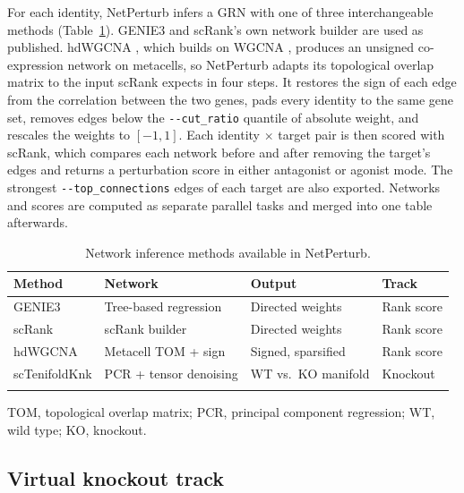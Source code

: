 \documentclass[unnumsec,webpdf,contemporary,large]{oup-authoring-template}
\newcommand{\param}[1]{\texttt{-{}-#1}}
\begin{document}
For each identity, NetPerturb infers a GRN with one of three interchangeable methods (Table~\ref{tab:methods}). GENIE3 \citep{HuynhThu2010genie3} and scRank's own network builder \citep{Li2024scrank} are used as published. hdWGCNA \citep{Morabito2023hdwgcna}, which builds on WGCNA \citep{Langfelder2008wgcna}, produces an unsigned co-expression network on metacells, so NetPerturb adapts its topological overlap matrix to the input scRank expects in four steps. It restores the sign of each edge from the correlation between the two genes, pads every identity to the same gene set, removes edges below the \param{cut\_ratio} quantile of absolute weight, and rescales the weights to $[-1,1]$. Each identity $\times$ target pair is then scored with scRank, which compares each network before and after removing the target's edges and returns a perturbation score in either antagonist or agonist mode. The strongest \param{top\_connections} edges of each target are also exported. Networks and scores are computed as separate parallel tasks and merged into one table afterwards.

\begin{table}[!t]
\begin{center}
\begin{minipage}{\columnwidth}
\caption{Network inference methods available in NetPerturb.\label{tab:methods}}%
\small\begin{tabular}{@{}llll@{}}
\toprule
Method & Network & Output & Track \\
\midrule
GENIE3      & Tree-based regression  & Directed weights       & Rank score \\
scRank      & scRank builder   & Directed weights       & Rank score \\
hdWGCNA     & Metacell TOM + sign    & Signed, sparsified     & Rank score \\
scTenifoldKnk & PCR + tensor denoising & WT vs.\ KO manifold  & Knockout \\
\botrule
\end{tabular}
\begin{tablenotes}%
\item TOM, topological overlap matrix; PCR, principal component regression; WT, wild type; KO, knockout.
\end{tablenotes}
\end{minipage}
\end{center}
\end{table}

\subsection{Virtual knockout track}
\end{document}
